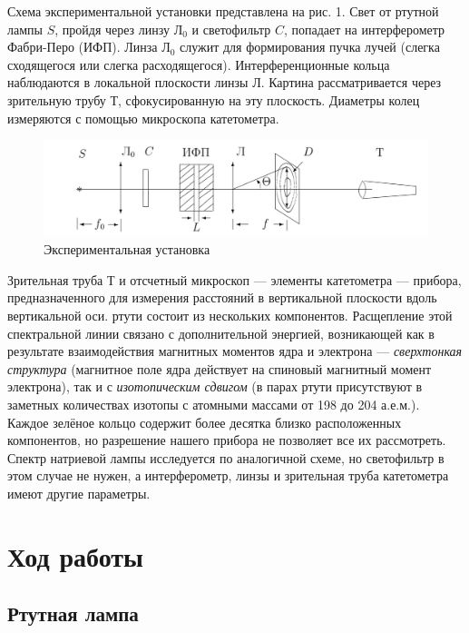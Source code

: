 \documentclass[a4paper, 12pt]{article}%
\begin{document}
\item Схема экспериментальной установки представлена на рис. 1. Свет от ртутной лампы $ S $, пройдя через линзу Л$_0 $ и светофильтр $ C $, попадает на интерферометр Фабри-Перо (ИФП). Линза Л$_0 $ служит для формирования пучка лучей (слегка сходящегося или слегка расходящегося). Интерференционные кольца наблюдаются в локальной плоскости линзы Л. Картина рассматривается через зрительную трубу Т, сфокусированную на эту плоскость. Диаметры колец измеряются с помощью микроскопа катетометра.
\item    
		\begin{figure}[h!]
		\centering
		\includegraphics[width=\linewidth]{lab.png}
		\caption{Экспериментальная установка}
		\label{lab}
	\end{figure}

\item Зрительная труба $ Т $ и отсчетный микроскоп  --- элементы катетометра --- прибора, предназначенного для измерения расстояний в вертикальной плоскости вдоль вертикальной оси.  ртути состоит из нескольких компонентов. Расщепление этой спектральной линии связано с дополнительной энергией, возникающей как в результате взаимодействия магнитных моментов ядра и электрона --- \textit{сверхтонкая структура} (магнитное поле ядра действует на спиновый магнитный момент электрона), так и с \textit{изотопическим сдвигом} (в парах ртути присутствуют в заметных количествах изотопы с атомными массами от 198 до 204 а.е.м.). Каждое зелёное кольцо содержит более десятка близко расположенных компонентов, но разрешение нашего прибора не позволяет все их рассмотреть.
	Спектр натриевой лампы исследуется по аналогичной схеме, но светофильтр в этом случае не нужен, а интерферометр, линзы и зрительная труба катетометра
	имеют другие параметры.

\item    
\item    
		\section{Ход работы}
		\item    
		\subsection{Ртутная лампа}
		
\end{document}
